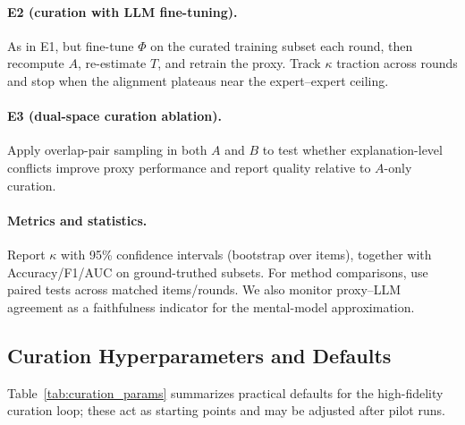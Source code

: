 \documentclass[ai,article,submit,pdftex,moreauthors]{Definitions/mdpi}
\begin{document}
\paragraph{E2 (curation with LLM fine-tuning).}
As in E1, but fine-tune $\Phi$ on the curated training subset each round, then recompute $A$, re-estimate $T$, and retrain the proxy. Track $\kappa$ traction across rounds and stop when the alignment plateaus near the expert–expert ceiling. 
%
%  

\paragraph{E3 (dual-space curation ablation).}
Apply overlap-pair sampling in both $A$ and $B$ to test whether explanation-level conflicts improve proxy performance and report quality relative to $A$-only curation.

\paragraph{Metrics and statistics.}
Report $\kappa$ with 95\% confidence intervals (bootstrap over items), together with Accuracy/F1/AUC on ground-truthed subsets. For method comparisons, use paired tests across matched items/rounds. We also monitor proxy–LLM agreement as a faithfulness indicator for the mental-model approximation. 
%
%  

\subsection{Curation Hyperparameters and Defaults}\label{subsec:hyperparams}
Table~\ref{tab:curation_params} summarizes practical defaults for the high-fidelity curation loop; these act as starting points and may be adjusted after pilot runs.
\end{document}
